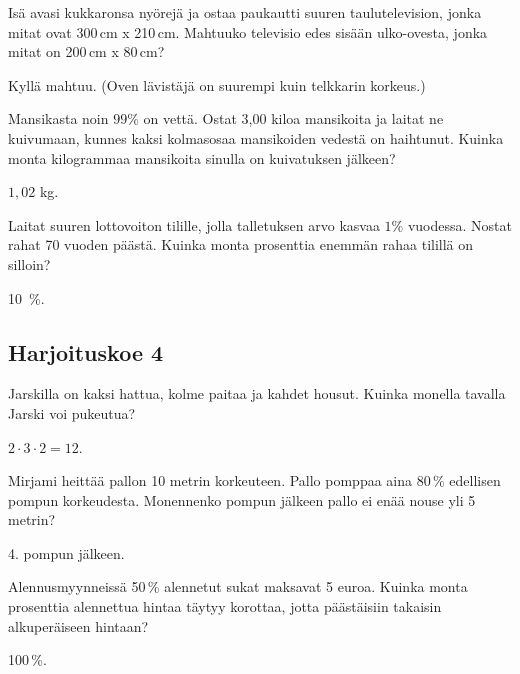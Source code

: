 	\begin{tehtava}
Isä avasi kukkaronsa nyörejä ja ostaa paukautti suuren taulutelevision, jonka mitat ovat 300\,cm x 210\,cm. Mahtuuko televisio edes sisään ulko-ovesta, jonka mitat on 200\,cm x 80\,cm?
	\begin{vastaus}
	 Kyllä mahtuu. (Oven lävistäjä on suurempi kuin telkkarin korkeus.)
	\end{vastaus}
	\end{tehtava}
	
	\begin{tehtava}
Mansikasta noin $99 \%$ on vettä. Ostat 3,00 kiloa mansikoita ja laitat ne kuivumaan, kunnes kaksi kolmasosaa mansikoiden vedestä on haihtunut. Kuinka monta kilogrammaa mansikoita sinulla on kuivatuksen jälkeen?
	\begin{vastaus}
	 $1,02$ kg.
	\end{vastaus}
	\end{tehtava}
	
	\begin{tehtava}
Laitat suuren lottovoiton tilille, jolla talletuksen arvo kasvaa $1 \%$ vuodessa. Nostat rahat 70 vuoden päästä. Kuinka monta prosenttia enemmän rahaa tilillä on silloin?
	\begin{vastaus}
	 10\, \%.
	\end{vastaus}
	\end{tehtava}
	
\subsection*{Harjoituskoe 4}
	
	\begin{tehtava}
Jarskilla on kaksi hattua, kolme paitaa ja kahdet housut. Kuinka monella tavalla Jarski voi pukeutua?
	 \begin{vastaus}
	  $2 \cdot 3 \cdot 2 = 12$.
	 \end{vastaus}
	 \end{tehtava}
	 
	\begin{tehtava}
Mirjami heittää pallon 10 metrin korkeuteen. Pallo pomppaa aina 80\,\% edellisen pompun korkeudesta. Monennenko pompun jälkeen pallo ei enää nouse yli 5 metrin?
	\begin{vastaus}
	 4. pompun jälkeen.
	\end{vastaus}
	\end{tehtava}
	
	\begin{tehtava}
Alennusmyynneissä 50\,\% alennetut sukat maksavat 5 euroa. Kuinka monta prosenttia alennettua hintaa täytyy korottaa, jotta päästäisiin takaisin alkuperäiseen hintaan?
	\begin{vastaus}
	 100\,\%.
	\end{vastaus}
	\end{tehtava}
	
